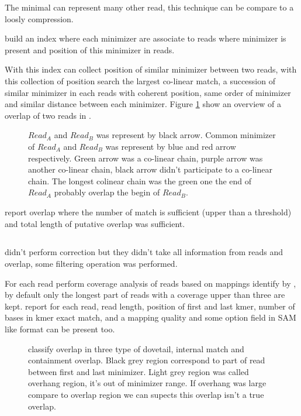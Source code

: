 \documentclass[main]{subfiles}
\begin{document}
The minimal \kmer can represent many other read, this technique can be compare to a loosly compression.

\minimap build an index where each minimizer are associate to reads where minimizer is present and position of this minimizer in reads.

With this index \minimap can collect position of similar minimizer between two reads, with this collection of position \minimap search the largest co-linear match, a succession of similar minimizer in each reads with coherent position, same order of minimizer and similar distance between each minimizer. Figure \ref{sota:fig:miniasm:mapping} show an overview of a overlap of two reads in \minimap.

\begin{figure}[ht]
    \centering
    
    \caption{$Read_A$ and $Read_B$ was represent by black arrow. Common minimizer of $Read_A$ and $Read_B$ was represent by blue and red arrow respectively. Green arrow was a co-linear chain, purple arrow was another co-linear chain, black arrow didn't participate to a co-linear chain. The longest colinear chain was the green one the end of $Read_A$ probably overlap the begin of $Read_B$.}
    \label{sota:fig:miniasm:mapping}
\end{figure}

\minimap report overlap where the number of match is sufficient (upper than a threshold) and  total length of putative overlap was sufficient. 

\subsection{\miniasm}

\miniasm didn't perform correction but they didn't take all information from reads and overlap, some filtering operation was performed.

For each read \miniasm perform coverage analysis of reads based on mappings identify by \minimap, by default only the longest part of reads with a coverage upper than three are kept. \minimap report for each read, read length, position of first and last kmer, number of bases in kmer exact match,  and a mapping quality and some option field in SAM like format can be present too.

\begin{figure}[ht]
    \centering
    
    \caption{\miniasm classify overlap in three type of dovetail, internal match and containment overlap. Black grey region correspond to part of read between first and last minimizer. Light grey region was called overhang region, it's out of minimizer range. If overhang was large compare to overlap region we can supects this overlap isn't a true overlap.}
    \label{sota:fig:miniasm:ovl_classification}
\end{figure}
\end{document}
